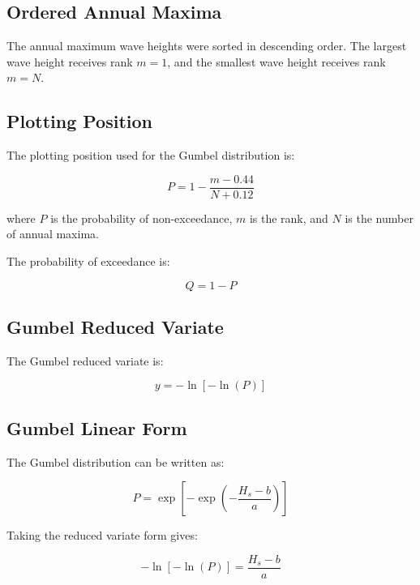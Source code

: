 \documentclass[12pt,a4paper]{article}
\begin{document}
\subsection{Ordered Annual Maxima}

The annual maximum wave heights were sorted in descending order. The largest wave height receives rank \(m=1\), and the smallest wave height receives rank \(m=N\).

\subsection{Plotting Position}

The plotting position used for the Gumbel distribution is:

\begin{equation}
P = 1 - \frac{m-0.44}{N+0.12}
\end{equation}

where \(P\) is the probability of non-exceedance, \(m\) is the rank, and \(N\) is the number of annual maxima.

The probability of exceedance is:

\begin{equation}
Q = 1-P
\end{equation}

\subsection{Gumbel Reduced Variate}

The Gumbel reduced variate is:

\begin{equation}
y = -\ln[-\ln(P)]
\end{equation}

\subsection{Gumbel Linear Form}

The Gumbel distribution can be written as:

\begin{equation}
P = \exp\left[-\exp\left(-\frac{H_s-b}{a}\right)\right]
\end{equation}

Taking the reduced variate form gives:

\begin{equation}
-\ln[-\ln(P)] = \frac{H_s-b}{a}
\end{equation}
\end{document}
